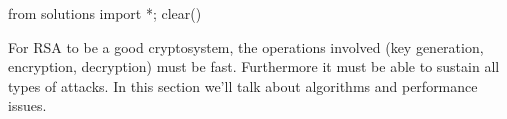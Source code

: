 \begin{python0}
from solutions import *; clear()
\end{python0}

For RSA to be a good cryptosystem, the operations involved (key
generation, encryption, decryption) must be fast. Furthermore it
must be able to sustain all types of attacks. In this section
we'll talk about algorithms and performance issues.
